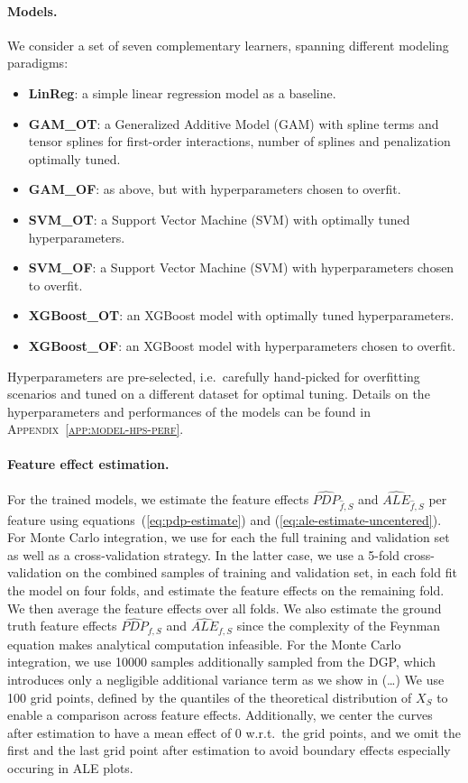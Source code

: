\documentclass[runningheads]{llncs}
\begin{document}
\paragraph{Models.}
We consider a set of seven complementary learners, spanning different modeling
paradigms:

\begin{itemize}[label=--]
    \item \textbf{LinReg}: a simple linear regression model as a baseline.
    \item \textbf{GAM\_OT}: a Generalized Additive Model (GAM) with spline terms
          and tensor splines for first-order interactions, number of splines
          and penalization optimally tuned.
    \item \textbf{GAM\_OF}: as above, but with hyperparameters chosen to overfit.
    \item \textbf{SVM\_OT}: a Support Vector Machine (SVM) with optimally tuned hyperparameters.
    \item \textbf{SVM\_OF}: a Support Vector Machine (SVM) with hyperparameters chosen to overfit.
    \item \textbf{XGBoost\_OT}: an XGBoost model with optimally tuned hyperparameters.
    \item \textbf{XGBoost\_OF}: an XGBoost model with hyperparameters chosen to overfit.
\end{itemize}

\noindent Hyperparameters are pre-selected, i.e.\ carefully hand-picked for overfitting scenarios
and tuned on a different dataset for optimal tuning. Details on the hyperparameters and performances
of the models can be found in \textsc{Appendix~\ref{app:model-hps-perf}}.

\paragraph{Feature effect estimation.}
For the trained models, we estimate the feature effects $\widehat{PDP}_{\hat{f},S}$
and $\widehat{ALE}_{\hat f,S}$ per feature using
equations~(\ref{eq:pdp-estimate}) and (\ref{eq:ale-estimate-uncentered}). For
Monte Carlo integration, we use for each the full training and validation set
as well as a cross-validation strategy. In the latter case, we use a 5-fold
cross-validation on the combined samples of training and validation set, in
each fold fit the model on four folds, and estimate the feature effects on the
remaining fold. We then average the feature effects over all folds. We also
estimate the ground truth feature effects $\widehat{PDP}_{f,S}$ and
$\widehat{ALE}_{f,S}$ since the complexity of the Feynman equation makes
analytical computation infeasible. For the Monte Carlo integration, we use
10000 samples additionally sampled from the DGP, which introduces only a
negligible additional variance term as we show in (\dots) We use 100 grid
points, defined by the quantiles of the theoretical distribution of $X_S$ to
enable a comparison across feature effects. Additionally, we center the curves
after estimation to have a mean effect of $0$ w.r.t.\ the grid points, and we
omit the first and the last grid point after estimation to avoid boundary
effects especially occuring in ALE plots.
\end{document}
